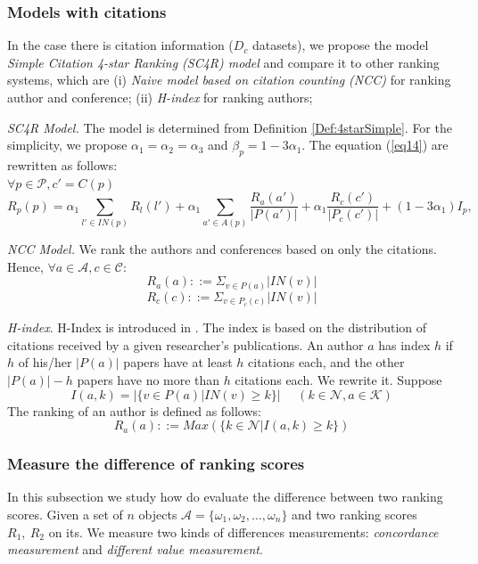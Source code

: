 \documentclass[10pt,leqno,twoside]{article}
\begin{document}
\subsubsection{Models with citations}
In the case there is citation information ($D_c$ datasets), we propose the model \textit{Simple Citation 4-star Ranking (SC4R) model} and compare it to other ranking systems, which are (i) \textit{Naive model based on citation counting (NCC)} for ranking author and conference; (ii) \textit{H-index} for ranking authors;

\textit{SC4R Model.} The model is determined from Definition \ref{Def:4starSimple}.
For the simplicity, we propose $\alpha_1=\alpha_2=\alpha_3$ and $\beta_p = 1-3\alpha_1 $.  The equation (\ref{eq14}) are rewritten as follows:\\ $\forall p\in\mathcal{P}, c' = C(p)$
\begin{equation}\label{eq16}
R_p(p) = \alpha_1\sum_{l'\in IN(p)}R_l(l') + \alpha_1\sum_{a'\in A(p)}\frac{R_a(a')}{|P(a')|} + \alpha_1\frac{R_c(c')}{|P_c(c')|} + (1-3\alpha_1)I_p,
\end{equation}


\textit{NCC Model.} We rank the authors and conferences based on only the citations.  Hence,
 $\forall a \in \mathcal{A}, c \in \mathcal{C}:$
\begin{equation}
R_a(a) ::= \Sigma_{v \in P(a)}|IN(v)|
\end{equation}
\begin{equation}
R_c(c) ::= \Sigma_{v \in P_c(c)} |IN(v)|
\end{equation}

\textit{H-index}. H-Index is introduced in \cite{HIndex}. The index is based on the distribution of citations received by a given researcher's publications. An author $a$ has index $h$ if $h$ of his/her $|P(a)|$ papers have at least $h$ citations each, and the other $|P(a)|-h$ papers have no more than $h$ citations each. We rewrite it.
Suppose $$I(a,k)=|\{ v \in P(a)|IN(v) \geq k\}| ~~~~~~(k \in \mathcal{N}, a \in \mathcal{K})$$ 
The ranking of an author is defined as follows:
\begin{equation}
R_a(a) ::= Max(\{k \in \mathcal{N}| I(a,k)\geq k\})
\end{equation}



\subsubsection{Measure the difference of ranking scores}
In this subsection we study how do evaluate the difference between two ranking scores. Given a set of $n$ objects $\mathcal{A} = \{\omega_1,\omega_2,\ldots,\omega_n\}$ and two ranking scores $R_1,~R_2$ on its.
We measure two kinds of differences measurements: \textit{concordance measurement} and \textit{different value measurement}.
\end{document}
